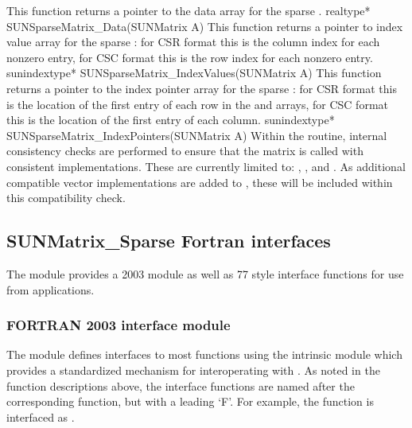 {
  This function returns a pointer to the data array for the
  sparse . 
}
{
  realtype* SUNSparseMatrix\_Data(SUNMatrix A)
}
{
  This function returns a pointer to index value array for the sparse
  : for CSR format this is the column index for each nonzero
  entry, for CSC format this is the row index for each nonzero entry.
}
{
  sunindextype* SUNSparseMatrix\_IndexValues(SUNMatrix A)
}
{
  This function returns a pointer to the index pointer array for the
  sparse : for CSR format this is the location of the first
  entry of each row in the  and  arrays, for
  CSC format this is the location of the first entry of each column.
}
{
  sunindextype* SUNSparseMatrix\_IndexPointers(SUNMatrix A)
}
{\warn} Within the  routine, internal
consistency checks are performed to ensure that the matrix is called
with consistent {\nvector} implementations.  These are currently
limited to: {\nvecs}, {\nvecopenmp}, and {\nvecpthreads}.  As
additional compatible vector implementations are added to {\sundials},
these will be included within this compatibility check. 


\subsection{SUNMatrix\_Sparse Fortran interfaces}
\label{ss:sunmat_sparse_fortran}

The {\sunmatsparse} module provides a {\F} 2003 module as well as {\F} 77
style interface functions for use from {\F} applications.

\subsubsection*{FORTRAN 2003 interface module}
The  {\F} module defines interfaces to most
{\sunmatsparse} {\CC} functions using the intrinsic 
module which provides a standardized mechanism for interoperating with {\CC}. As
noted in the {\CC} function descriptions above, the interface functions are
named after the corresponding {\CC} function, but with a leading `F'. For
example, the function  is interfaced as
.

